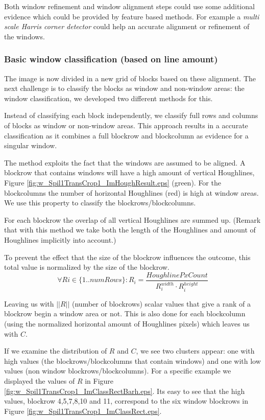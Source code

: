 Both window refinement and window alignment steps could use some additional
evidence which could be provided by feature based methods.  For example a
\emph{multi scale Harris corner detector} could help an accurate alignment or
refinement of the windows.








\subsubsection{Basic window classification (based on line amount)}
The image is now divided in a new grid of blocks based on these
alignment. The next challenge is to classify the blocks as window and
non-window areas: the window classification, we developed two different methods for this.

Instead of classifying each block independently, we classify full rows and
columns of blocks as window or non-window areas.  This approach results in a accurate
classification as it combines a full blockrow and blockcolumn as evidence for a singular
window. 

The method exploits the fact that the windows are assumed to be
aligned.
A blockrow that contains windows will have a high amount of vertical
Houghlines, Figure \ref{fig:w_Spil1TransCrop1_ImHoughResult.eps}
(green). For the blockcolumns the number of horizontal Houghlines
 (red) is high at window areas.  We use this property to classify 
 the blockrows/blockcolumns. 

For each blockrow the overlap of all vertical Houghlines are summed up.
(Remark that with this method we take both the length of the Houghlines and
amount of Houghlines implicitly into account.)

To prevent the effect that the size of the blockrow influences the outcome, this total value
is normalized by the size of the blockrow.
\[\forall Ri\in \{1..numRows\} : R_i = \frac{HoughlinePxCount}{R_i^{width} \cdot R_i^{height}}\]

Leaving us with $||R||$ (number of blockrows) scalar values that give a rank of a blockrow begin a window area or not.
This is also done for each blockcolumn (using the normalized horizontal amount of
Houghlines pixels) which leaves us with $C$.

If we examine the distribution of $R$ and $C$, we see two clusters appear: one with
high values (the blockrows/blockcolumns that contain windows) and one with low values (non window
blockrows/blockcolumns). For a specific example we displayed the values of $R$ in Figure \ref{fig:w_Spil1TransCrop1_ImClassRectBarh.eps}.
Its easy to see that the high values, blockrow 4,5,7,8,10 and 11, correspond to the
six window blockrows in Figure \ref{fig:w_Spil1TransCrop1_ImClassRect.eps}.

